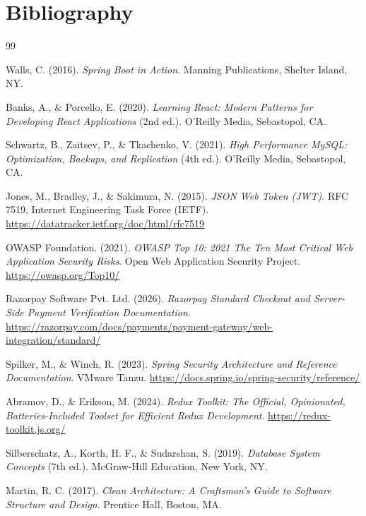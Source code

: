 \chapter{Bibliography}
\label{ch:bibliography}

\begin{thebibliography}{99}

Walls, C. (2016). \textit{Spring Boot in Action}. Manning Publications, Shelter Island, NY.

Banks, A., \& Porcello, E. (2020). \textit{Learning React: Modern Patterns for Developing React Applications} (2nd ed.). O'Reilly Media, Sebastopol, CA.

Schwartz, B., Zaitsev, P., \& Tkachenko, V. (2021). \textit{High Performance MySQL: Optimization, Backups, and Replication} (4th ed.). O'Reilly Media, Sebastopol, CA.

Jones, M., Bradley, J., \& Sakimura, N. (2015). \textit{JSON Web Token (JWT)}. RFC 7519, Internet Engineering Task Force (IETF). \url{https://datatracker.ietf.org/doc/html/rfc7519}

OWASP Foundation. (2021). \textit{OWASP Top 10: 2021 The Ten Most Critical Web Application Security Risks}. Open Web Application Security Project. \url{https://owasp.org/Top10/}

Razorpay Software Pvt. Ltd. (2026). \textit{Razorpay Standard Checkout and Server-Side Payment Verification Documentation}. \url{https://razorpay.com/docs/payments/payment-gateway/web-integration/standard/}

Spilker, M., \& Winch, R. (2023). \textit{Spring Security Architecture and Reference Documentation}. VMware Tanzu. \url{https://docs.spring.io/spring-security/reference/}

Abramov, D., \& Erikson, M. (2024). \textit{Redux Toolkit: The Official, Opinionated, Batteries-Included Toolset for Efficient Redux Development}. \url{https://redux-toolkit.js.org/}

Silberschatz, A., Korth, H. F., \& Sudarshan, S. (2019). \textit{Database System Concepts} (7th ed.). McGraw-Hill Education, New York, NY.

Martin, R. C. (2017). \textit{Clean Architecture: A Craftsman's Guide to Software Structure and Design}. Prentice Hall, Boston, MA.

\end{thebibliography}
